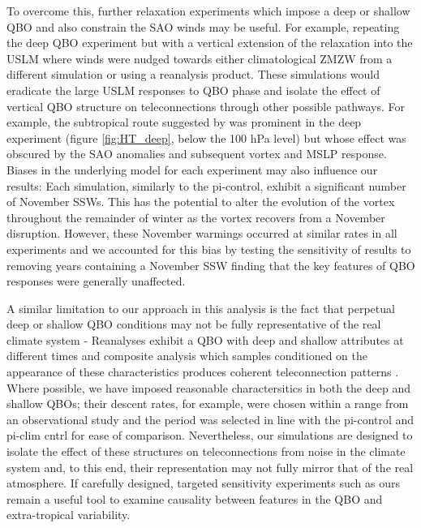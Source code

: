 To overcome this, further relaxation experiments which impose a deep or shallow QBO and also constrain the SAO winds may be useful. For example, repeating the deep QBO experiment but with a vertical extension of the relaxation into the USLM where winds were nudged towards either climatological ZMZW from a different simulation or using a reanalysis product. These simulations would eradicate the large USLM responses to QBO phase and isolate the effect of vertical QBO structure on teleconnections through other possible pathways. For example, the subtropical route suggested by \cite{graySurface2018b} was prominent in the deep experiment (figure \ref{fig:HT_deep}, below the 100 hPa level) but whose effect was obscured by the SAO anomalies and subsequent vortex and MSLP response. Biases in the underlying model for each experiment may also influence our results: Each simulation, similarly to the pi-control, exhibit a significant number of November SSWs. This has the potential to alter the evolution of the vortex throughout the remainder of winter as the vortex recovers from a November disruption. However, these November warmings occurred at similar rates in all experiments and we accounted for this bias by testing the sensitivity of results to removing years containing a November SSW finding that the key features of QBO responses were generally unaffected.

A similar limitation to our approach in this analysis is the fact that perpetual deep or shallow QBO conditions may not be fully representative of the real climate system - Reanalyses exhibit a QBO with deep and shallow attributes at different times and composite analysis which samples conditioned on the appearance of these characteristics produces coherent teleconnection patterns \citep{andrewsObserved2019d}. Where possible, we have imposed reasonable charactersitics in both the deep and shallow QBOs; their descent rates, for example, were chosen within a range from an observational study \citep{kinnersleyDescent1996} and the period was selected in line with the pi-control and pi-clim cntrl for ease of comparison. Nevertheless, our simulations are designed to isolate the effect of these structures on teleconnections from noise in the climate system and, to this end, their representation may not fully mirror that of the real atmosphere. If carefully designed, targeted sensitivity experiments such as ours remain a useful tool to examine causality between features in the QBO and extra-tropical variability.
